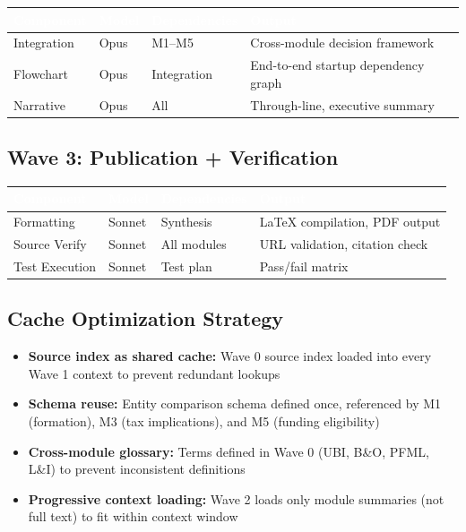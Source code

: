 \documentclass[11pt,letterpaper]{article}
\newcommand{\tableheader}[1]{\textbf{\sffamily\textcolor{white}{#1}}}
\begin{document}
\begin{center}
\begin{tabularx}{\textwidth}{L{3cm}C{1.5cm}L{2.5cm}X}
\toprule
{}
\tableheader{Component} & \tableheader{Model} & \tableheader{Dependencies} & \tableheader{Output} \\
\midrule
Integration & Opus & M1--M5 & Cross-module decision framework \\
Flowchart & Opus & Integration & End-to-end startup dependency graph \\
Narrative & Opus & All & Through-line, executive summary \\
\bottomrule
\end{tabularx}
\end{center}

\subsection{Wave 3: Publication + Verification}

\begin{center}
\begin{tabularx}{\textwidth}{L{3cm}C{1.5cm}L{2.5cm}X}
\toprule
{}
\tableheader{Component} & \tableheader{Model} & \tableheader{Dependencies} & \tableheader{Output} \\
\midrule
Formatting & Sonnet & Synthesis & LaTeX compilation, PDF output \\
Source Verify & Sonnet & All modules & URL validation, citation check \\
Test Execution & Sonnet & Test plan & Pass/fail matrix \\
\bottomrule
\end{tabularx}
\end{center}

\subsection{Cache Optimization Strategy}

\begin{itemize}[leftmargin=2em]
  \item \textbf{Source index as shared cache:} Wave 0 source index loaded into every Wave 1 context to prevent redundant lookups
  \item \textbf{Schema reuse:} Entity comparison schema defined once, referenced by M1 (formation), M3 (tax implications), and M5 (funding eligibility)
  \item \textbf{Cross-module glossary:} Terms defined in Wave 0 (UBI, B\&O, PFML, L\&I) to prevent inconsistent definitions
  \item \textbf{Progressive context loading:} Wave 2 loads only module summaries (not full text) to fit within context window
\end{itemize}
\end{document}
